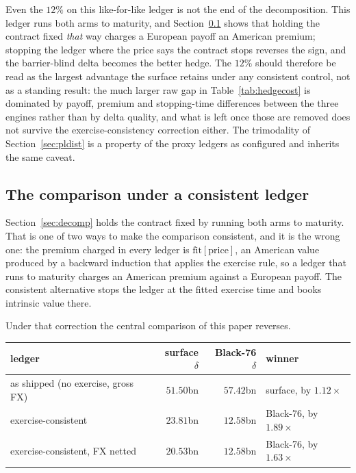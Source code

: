 \documentclass[11pt,a4paper]{article}
\begin{document}
Even the $12\%$ on this like-for-like ledger is not the end of the decomposition. This ledger runs both arms to maturity, and Section~\ref{sec:consistent} shows that holding the contract fixed \emph{that} way charges a European payoff an American premium; stopping the ledger where the price says the contract stops reverses the sign, and the barrier-blind delta becomes the better hedge. The $12\%$ should therefore be read as the largest advantage the surface retains under any consistent control, not as a standing result: the much larger raw gap in Table~\ref{tab:hedgecost} is dominated by payoff, premium and stopping-time differences between the three engines rather than by delta quality, and what is left once those are removed does not survive the exercise-consistency correction either. The trimodality of Section~\ref{sec:pldist} is a property of the proxy ledgers as configured and inherits the same caveat.

\subsection{The comparison under a consistent ledger}
\label{sec:consistent}

Section~\ref{sec:decomp} holds the contract fixed by running both arms to maturity. That is one of two ways to make the comparison consistent, and it is the wrong one: the premium charged in every ledger is $\mathrm{fit}[\mathrm{price}]$, an American value produced by a backward induction that applies the exercise rule, so a ledger that runs to maturity charges an American premium against a European payoff. The consistent alternative stops the ledger at the fitted exercise time and books intrinsic value there.

Under that correction the central comparison of this paper reverses.

\begin{center}
\small
\begin{tabular}{lrrl}
\toprule
ledger & surface $\delta$ & Black-76 $\delta$ & winner \\
\midrule
as shipped (no exercise, gross FX) & $51.50$bn & $57.42$bn & surface, by $1.12\times$ \\
exercise-consistent & $23.81$bn & $12.58$bn & Black-76, by $1.89\times$ \\
exercise-consistent, FX netted & $20.53$bn & $12.58$bn & Black-76, by $1.63\times$ \\
\bottomrule
\end{tabular}
\end{center}
\end{document}

